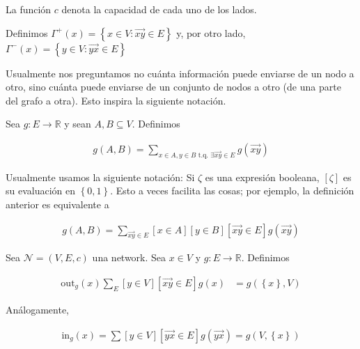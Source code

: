 \documentclass[a4paper, 12pt]{article}
\begin{document}
La función $c$ denota la capacidad de cada uno de los lados.

\begin{definition}[Vecinos]
    Definimos $\Gamma^{+}(x) = \left\{ x \in V : \overrightarrow{xy} \in E \right\} $ y,
    por otro lado,
    $\Gamma^{-}(x) = \left\{ y \in V : \overrightarrow{yx} \in E \right\} $
\end{definition}

Usualmente nos preguntamos no cuánta información puede enviarse de un nodo a
otro, sino cuánta puede enviarse de un conjunto de nodos a otro (de una parte
del grafo a otra). Esto inspira la siguiente notación.

\begin{definition}
    Sea $g : E \to \mathbb{R}$ y sean $A, B \subseteq V$. Definimos  

    \begin{align*}
        g(A, B) = \sum_{x \in A, y \in B \text{ t.q. } \exists \overrightarrow{xy} \in E}
        g(\overrightarrow{xy})
    \end{align*}
\end{definition}

Usualmente usamos la siguiente notación: Si $\zeta$ es una expresión booleana,
$[\zeta]$ es su evaluación en $\left\{ 0, 1 \right\} $. Esto a veces facilita
las cosas; por ejemplo, la definición anterior es equivalente a

\begin{align*}
    g(A, B) = \sum_{\overrightarrow{xy} \in E}[x \in A] [y \in B] [\overrightarrow{xy} \in E] g(\overrightarrow{xy})
\end{align*}

\begin{definition}
    Sea $\mathcal{N} = (V, E, c)$ una network. Sea $x \in V$ y $g : E \to
    \mathbb{R}$. Definimos 

    \begin{align*}
        \text{out}_{g}(x) \sum_{E} [y \in V][\overrightarrow{xy} \in E]g(x) &= g \left(
        \left\{ x \right\}, V  \right) 
    \end{align*}

    Análogamente, 

    \begin{align*}
        \text{in}_g(x) = \sum[y \in V] [\overrightarrow{yx} \in E]g(\overrightarrow{yx}) = g\left( V,
        \left\{ x \right\} \right) 
    \end{align*}
\end{definition}
\end{document}
